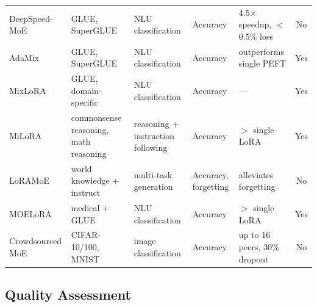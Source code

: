 \begin{table}
{\begin{tabular}{lllllc}
  DeepSpeed-MoE~\cite{RajbhandariDeepSpeed2022} & GLUE, SuperGLUE & NLU
  classification & Accuracy & 4.5$\times$ speedup, $<$0.5\% loss & No \\
  AdaMix~\cite{WangAdaMix2022} & GLUE, SuperGLUE & NLU classification &
  Accuracy & outperforms single PEFT & Yes \\
  MixLoRA~\cite{LiMixLoRA2024} & GLUE, domain-specific & NLU classification &
  Accuracy & --- & Yes \\
  MiLoRA~\cite{ZhangMiLoRA2024} & commonsense reasoning, math reasoning &
  reasoning + instruction following & Accuracy & $>$ single LoRA & Yes \\
  LoRAMoE~\cite{DouLoRAMoE2024} & world knowledge + instruct & multi-task
  generation & Accuracy, forgetting & alleviates forgetting & No \\
  MOELoRA~\cite{LiuWhenMOE2024} & medical + GLUE & NLU classification &
  Accuracy & $>$ single LoRA & Yes \\
  Crowdsourced MoE~\cite{RyabininCrowdsourced2020} & CIFAR-10/100, MNIST &
  image classification & Accuracy & up to 16 peers, 30\% dropout & No \\
\bottomrule
  \end{tabular}
  }
\end{table}

\subsection{Quality Assessment}
\label{sec:methodology:quality}


